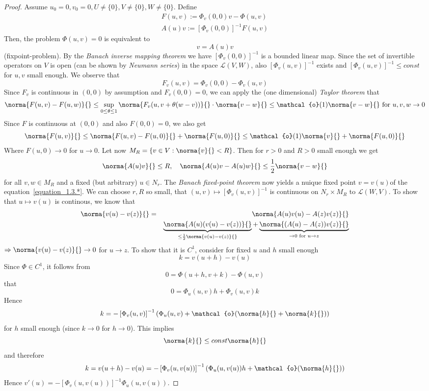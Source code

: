 \begin{proof}
	Assume $u_0=0, v_0=0, U\not=\{0\}, V\not=\{0\}, W\not=\{0\}$. Define 
	\begin{eqnarray}
		F(u,v) := \Phi_v(0,0)v - \Phi(u,v) \nonumber \\
		A(u)v := \left[\Phi_v(0,0)\right]^{-1} F(u,v) 
	\end{eqnarray}
	Then, the problem $\Phi(u,v) = 0$ is equivalent to 
	\begin{equation}\label{equation_1.3.*}
		v = A(u)v
	\end{equation}
	 (fixpoint-problem). By the \emph{Banach inverse mapping theorem} we have $\left[\Phi_v(0,0)\right]^{-1}$ is a bounded linear map. Since the set of invertible operators on $V$ is open (can be shown by \emph{Neumann series}) in the space $\mathcal{L}(V,W)$, also $\left[\Phi_v(u,v)\right]^{-1}$ exists and $\left[\Phi_v(u,v)\right]^{-1}\leq const$ for $u,v$ small enough.\newline\noindent
	We observe that 
	\[
		F_v(u,v) = \Phi_v(0,0) - \Phi_v(u,v)
	\]
	Since $F_v$ is continuous in $(0,0)$ by assumption and $F_v(0,0) = 0$, we can apply the (one dimensional) \emph{Taylor theorem} that
	\[
		\norma{F(u,v)-F(u,w)}{} \leq \sup_{0\leq\theta\leq 1} \norma{F_v(u,v+\theta(w-v))}{}\cdot\norma{v-w}{} \leq \mathcal{o}(1)\norma{v-w}{}\text{ for } u,v,w\to 0
	\]
	Since $F$ is continuous at $(0,0)$ and also $F(0,0) = 0$, we also get
	\[
		\norma{F(u,v)}{} \leq \norma{F(u,v)-F(u,0)}{} + \norma{F(u,0)}{} \leq \mathcal{o}(1)\norma{v}{} + \norma{F(u,0)}{}
	\]
	Where $F(u,0)\to 0$ for $u\to 0$. Let now $M_R=\{v\in V:\norma{v}{} < R\}$. Then for $r>0$ and $R>0$ small enough we get
	\[
		\norma{A(u)v}{}\leq R,\quad\norma{A(u)v-A(u)w}{}\leq\frac{1}{2}\norma{v-w}{}
	\] 
	for all $v,w\in M_R$ and a fixed (but arbitrary) $u\in N_r$. The \emph{Banach fixed-point theorem} now yields a nuique fixed point $v = v(u)$of the equation~\ref{equation_1.3.*}. \newline\noindent
	We can choose $r,R$ so small, that $(u,v)\mapsto\left[\Phi_v(u,v)\right]^{-1}$ is continuous on $N_r\times M_R$ to $\mathcal{L}(W,V)$. To show that $u\mapsto v(u)$ is continous, we know that
	\begin{eqnarray}
		\norma{v(u)-v(z)}{} &=& \norma{A(u)v(u)-A(z)v(z)}{} \nonumber\\
		&& \underbrace{\norma{A(u)(v(u)-v(z))}{}}_{\leq\frac{1}{2}\norma{v(u)-v(z)}{}} + \underbrace{\norma{(A(u)-A(z))v(z)}{}}_{\to 0\text{ for }u\to z} \nonumber
	\end{eqnarray}
	$\Rightarrow \norma{v(u)-v(z)}{}\to 0$ for $u\to z$. To show that it is $C^1$, consider for fixed $u$ and $h$ small enough
	\[
		k= v(u+h)-v(u)
	\]
	Since $\Phi\in C^1$, it follows from
	\[
		0 = \Phi(u+h,v+k) - \Phi(u,v)
	\]
	that
	\[
		0 = \Phi_u(u,v)h + \Phi_v(u,v)k
	\]
	Hence 
	\[
		k = - \left[\Phi_v(u,v)\right]^{-1}\left(\Phi_u(u,v) + \mathcal{o}(\norma{h}{}+\norma{k}{})\right)
	\]
	for $h$ small enough (since $k\to 0$ for $h\to 0$). This implies
	\[
		\norma{k}{}\leq const\norma{h}{}
	\]
	and therefore 
	\[
		k = v(u+h)-v(u) = -\left[\Phi_v(u,v(u))\right]^{-1}\left(\Phi_u(u,v(u))h+\mathcal{o}(\norma{h}{})\right)
	\]
	Hence $v'(u) = -\left[\Phi_v(u,v(u))\right]^{-1}\Phi_u(u,v(u))$. 
\end{proof}
